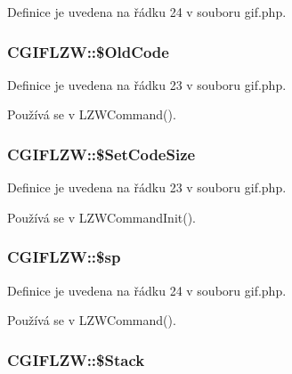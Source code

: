 Definice je uvedena na řádku 24 v souboru gif.\-php.

\hypertarget{class_c_g_i_f_l_z_w_a5f1dbf14218ff6db0994b5519b3bd7de}{
\subsubsection[{\$\-Old\-Code}]{\setlength{\rightskip}{0pt plus 5cm}C\-G\-I\-F\-L\-Z\-W\-::\$\-Old\-Code}}\label{class_c_g_i_f_l_z_w_a5f1dbf14218ff6db0994b5519b3bd7de}


Definice je uvedena na řádku 23 v souboru gif.\-php.



Používá se v L\-Z\-W\-Command().

\hypertarget{class_c_g_i_f_l_z_w_a0718d869dd834514add4cc4e979e6c7d}{
\subsubsection[{\$\-Set\-Code\-Size}]{\setlength{\rightskip}{0pt plus 5cm}C\-G\-I\-F\-L\-Z\-W\-::\$\-Set\-Code\-Size}}\label{class_c_g_i_f_l_z_w_a0718d869dd834514add4cc4e979e6c7d}


Definice je uvedena na řádku 23 v souboru gif.\-php.



Používá se v L\-Z\-W\-Command\-Init().

\hypertarget{class_c_g_i_f_l_z_w_a05cea57537d62249b3a42c1ef2031f2b}{
\subsubsection[{\$sp}]{\setlength{\rightskip}{0pt plus 5cm}C\-G\-I\-F\-L\-Z\-W\-::\$sp}}\label{class_c_g_i_f_l_z_w_a05cea57537d62249b3a42c1ef2031f2b}


Definice je uvedena na řádku 24 v souboru gif.\-php.



Používá se v L\-Z\-W\-Command().

\hypertarget{class_c_g_i_f_l_z_w_ace6b3e549ba14d8b44a6bd216d9d70fc}{
\subsubsection[{\$\-Stack}]{\setlength{\rightskip}{0pt plus 5cm}C\-G\-I\-F\-L\-Z\-W\-::\$\-Stack}}\label{class_c_g_i_f_l_z_w_ace6b3e549ba14d8b44a6bd216d9d70fc}



